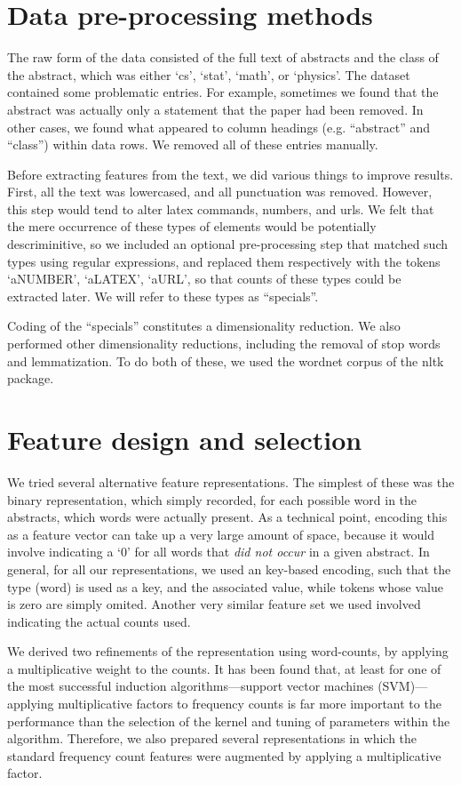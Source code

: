 \documentclass[conference,letterpaper]{IEEEtran}
\begin{document}
\section{Data pre-processing methods}
The raw form of the data consisted of the full text of abstracts and the
class of the abstract, which was either `cs', `stat', `math', or `physics'.
The dataset contained some problematic entries.  For example, sometimes we
found that the abstract was actually only a statement that the paper had been
removed.  In other cases, we found what appeared to column headings (e.g.
``abstract'' and ``class'') within data rows.  We removed all of these entries
manually.

Before extracting features from the text, we did various things to improve
results.  First, all the text was lowercased, and all punctuation was 
removed.  However, this step would tend to alter latex commands, numbers,
and urls.  We felt that the mere occurrence of these types of elements would
be potentially descriminitive, so we included an optional pre-processing step
that matched such types using regular expressions, and replaced them 
respectively with the tokens `aNUMBER', `aLATEX', `aURL', so that counts of
these types could be extracted later.  We will refer to these types as 
``specials''.

Coding of the ``specials'' constitutes a dimensionality reduction.  We also
performed other dimensionality reductions, including the removal of 
stop words and lemmatization.  To do both of these, we used the
wordnet corpus of the nltk package.

 
\section{Feature design and selection}
We tried several alternative feature representations.  The simplest of these
was the binary representation, which simply recorded, for each possible 
word in the abstracts, which words were actually present.  As a technical
point, encoding this as a feature vector can take up a very large amount of
space, because it would involve indicating a `0' for all words that 
\textit{did not occur} in a given abstract.  In general, for all our 
representations, we used an key-based encoding, such that the type (word)
is used as a key, and the associated value, while tokens whose value is 
zero are simply omited.  Another very similar feature set we used involved 
indicating the actual counts used.

We derived two refinements of the representation using word-counts, by applying
a multiplicative weight to the counts.  It has been found that, at least for
one of the most successful induction algorithms---support vector machines 
(SVM)---applying multiplicative factors to frequency counts is far more 
important to the performance than the selection of the kernel and tuning of 
parameters within the algorithm.  Therefore, we also prepared several 
representations in which the standard frequency count features were augmented
by applying a multiplicative factor.
\end{document}
